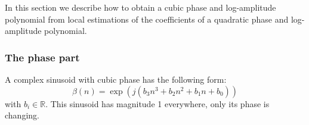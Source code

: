 In this section we describe how to obtain a cubic phase and log-amplitude polynomial from
local estimations of the coefficients of a quadratic phase and log-amplitude polynomial.

\subsubsection{The phase part}

A complex sinusoid with cubic phase has the following form:
\begin{equation}
    \label{eq:cubicphasepoly}
    \beta(n) = \exp \left(j\left(b_3 n^{3} + b_2 n^{2} + b_1 n + b_0
        \right)\right)
\end{equation}
with $b_{i} \in \mathbb{R}$. This sinusoid has magnitude 1 everywhere, only its
phase is changing.

